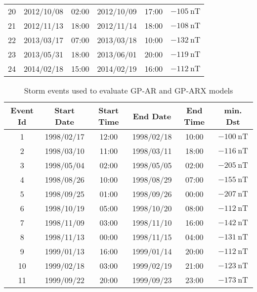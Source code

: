 \begin{table}[h]
\begin{tabular}{llllll}
    20 & 2012/10/08 & 02:00 & 2012/10/09 & 17:00 & $ \SI{-105}{\nano\tesla}$ \\
    21 & 2012/11/13 & 18:00 & 2012/11/14 & 18:00 & $ \SI{-108}{\nano\tesla}$ \\
    22 & 2013/03/17 & 07:00 & 2013/03/18 & 10:00 & $ \SI{-132}{\nano\tesla}$ \\
    23 & 2013/05/31 & 18:00 & 2013/06/01 & 20:00 & $ \SI{-119}{\nano\tesla}$ \\
    24 & 2014/02/18 & 15:00 & 2014/02/19 & 16:00 & $ \SI{-112}{\nano\tesla}$ \\ \hline
    \end{tabular}
    \end{table}
    
    

    \begin{table}[h]
    \centering
    \caption{Storm events used to evaluate GP-AR and GP-ARX models}
    \label{table:teststorms}
    \begin{adjustbox}{width=\textwidth,totalheight=0.9\textheight,keepaspectratio}
    \begin{tabular}{cccccc}
    \hline
    Event Id & Start Date & Start Time & End Date & End Time & min. Dst \\ \hline
    1 & 1998/02/17 & 12:00 & 1998/02/18 & 10:00 & $ \SI{-100}{\nano\tesla}$ \\
    2 & 1998/03/10 & 11:00 & 1998/03/11 & 18:00 & $ \SI{-116}{\nano\tesla}$ \\
    3 & 1998/05/04 & 02:00 & 1998/05/05 & 02:00 & $ \SI{-205}{\nano\tesla}$ \\
    4 & 1998/08/26 & 10:00 & 1998/08/29 & 07:00 & $ \SI{-155}{\nano\tesla}$ \\
    5 & 1998/09/25 & 01:00 & 1998/09/26 & 00:00 & $ \SI{-207}{\nano\tesla}$ \\
    6 & 1998/10/19 & 05:00 & 1998/10/20 & 08:00 & $ \SI{-112}{\nano\tesla}$ \\
    7 & 1998/11/09 & 03:00 & 1998/11/10 & 16:00 & $ \SI{-142}{\nano\tesla}$ \\
    8 & 1998/11/13 & 00:00 & 1998/11/15 & 04:00 & $ \SI{-131}{\nano\tesla}$ \\
    9 & 1999/01/13 & 16:00 & 1999/01/14 & 20:00 & $ \SI{-112}{\nano\tesla}$ \\
    10 & 1999/02/18 & 03:00 & 1999/02/19 & 21:00 & $ \SI{-123}{\nano\tesla}$ \\
    11 & 1999/09/22 & 20:00 & 1999/09/23 & 23:00 & $ \SI{-173}{\nano\tesla}$ \\

\end{tabular}
\end{adjustbox}
\end{table}
